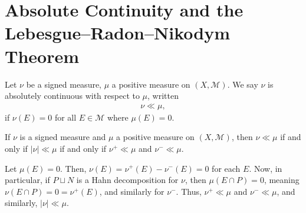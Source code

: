 \documentclass[10pt]{mypackage}
\begin{document}
\section{Absolute Continuity and the Lebesgue--Radon--Nikodym Theorem}%
\begin{definition}
  Let $\nu$ be a signed measure, $\mu$ a positive measure on $\left( X,\mathcal{M} \right)$. We say $\nu$ is absolutely continuous with respect to $\mu$, written
  \begin{align*}
    \nu\ll\mu,
  \end{align*}
  if $\nu\left( E \right) = 0$ for all $E\in \mathcal{M}$ where $\mu\left( E \right) = 0$.
\end{definition}
\begin{exercise}
  If $\nu$ is a signed measure and $\mu$ a positive measure on $\left( X,\mathcal{M} \right)$, then $\nu\ll\mu$ if and only if $\left\vert \nu \right\vert\ll\mu$ if and only if $\nu^{+} \ll\mu$ and $\nu^{-}\ll\mu$.
\end{exercise}
\begin{solution}
  Let $\mu\left( E \right) = 0$. Then, $\nu\left( E \right) = \nu^{+}\left( E \right) - \nu^{-}\left( E \right) = 0$ for each $E$. Now, in particular, if $P\sqcup N$ is a Hahn decomposition for $\nu$, then $\mu\left( E\cap P \right) = 0$, meaning $\nu\left( E\cap P \right) = 0 = \nu^{+}\left( E \right)$, and similarly for $\nu^{-}$. Thus, $\nu^{+}\ll\mu$ and $\nu^{-}\ll\mu$, and similarly, $\left\vert \nu \right\vert\ll\mu$.
\end{solution}
\end{document}
